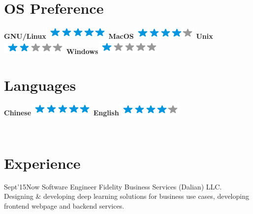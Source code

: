 \documentclass[]{friggeri-cv}
\begin{document}
\begin{aside}
  \section{OS Preference}
    \textbf{GNU/Linux}\includegraphics[scale=0.40]{img/5stars.png}
    \textbf{MacOS}\includegraphics[scale=0.40]{img/4stars.png}
    \textbf{Unix}\includegraphics[scale=0.40]{img/2stars.png}
    \textbf{Windows}\includegraphics[scale=0.40]{img/1stars.png}
    ~
  \section{Languages}
    \textbf{Chinese}\includegraphics[scale=0.40]{img/5stars.png}
    \textbf{English}\includegraphics[scale=0.40]{img/4stars.png}
    ~
\end{aside}
~
\section{Experience}
\begin{entrylist}
  \entry
    {Sept'15}{Now}
    {Software Engineer}
    {Fidelity Business Services (Dalian) LLC.}
    {Designing \& developing deep learning solutions for business use cases,
      developing frontend webpage and backend services. }
\end{entrylist}
~
\end{document}
